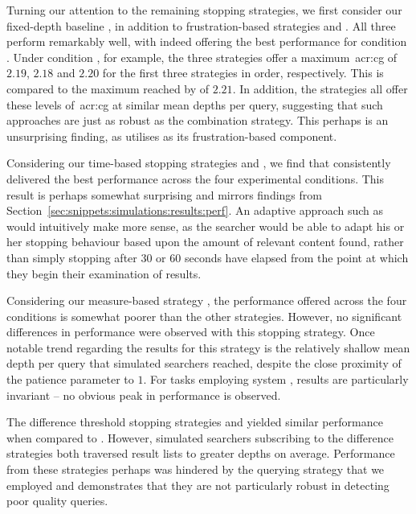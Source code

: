 Turning our attention to the remaining stopping strategies, we first consider our fixed-depth baseline , in addition to frustration-based strategies  and . All three perform remarkably well, with  indeed offering the best performance for condition . Under condition , for example, the three strategies offer a maximum~\gls{acr:cg} of $2.19$, $2.18$ and $2.20$ for the first three strategies in order, respectively. This is compared to the maximum reached by  of $2.21$. In addition, the strategies all offer these levels of~\gls{acr:cg} at similar mean depths per query, suggesting that such approaches are just as robust as the combination strategy. This perhaps is an unsurprising finding, as  utilises  as its frustration-based component.

Considering our time-based stopping strategies  and , we find that  consistently delivered the best performance across the four experimental conditions. This result is perhaps somewhat surprising and mirrors findings from Section~\ref{sec:snippets:simulations:results:perf}. An adaptive approach such as  would intuitively make more sense, as the searcher would be able to adapt his or her stopping behaviour based upon the amount of relevant content found, rather than simply stopping after $30$ or $60$ seconds have elapsed from the point at which they begin their examination of results.

Considering our measure-based strategy , the performance offered across the four conditions is somewhat poorer than the other strategies. However, no significant differences in performance were observed with this stopping strategy. Once notable trend regarding the results for this strategy is the relatively shallow mean depth per query that simulated searchers reached, despite the close proximity of the patience parameter to $1$. For tasks employing system , results are particularly invariant -- no obvious peak in performance is observed.

The difference threshold stopping strategies  and  yielded similar performance when compared to . However, simulated searchers subscribing to the difference strategies both traversed result lists to greater depths on average. Performance from these strategies perhaps was hindered by the querying strategy that we employed and demonstrates that they are not particularly robust in detecting poor quality queries.

